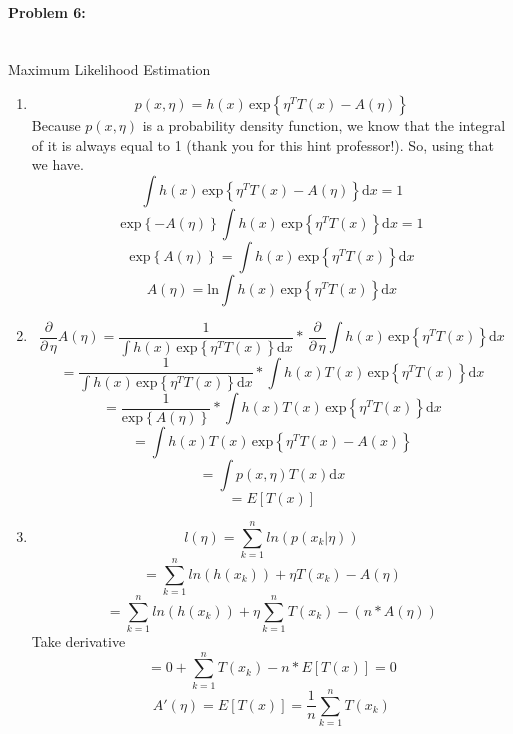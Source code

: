 \documentclass[12pt]{article}
\begin{document}
    \paragraph{Problem 6:}~\\
    Maximum Likelihood Estimation
    \begin{enumerate}
        \newcommand{\temp}{\int h(x) \, \mathrm{exp}\left\{ \eta^{T} T(x) \right\} \mathrm{d}x}
        \item
        \[ p(x, \eta) = h(x) \, \mathrm{exp}\left\{ \eta^{T} T(x) - A(\eta) \right\} \]
        Because \(p(x, \eta)\) is a probability density function, we know that the integral of it is 
        always equal to 1 (thank you for this hint professor!). So, using that we have.
        \[ \int h(x) \, \mathrm{exp}\left\{ \eta^{T} T(x) - A(\eta) \right\} \mathrm{d}x = 1 \]
        \[ \mathrm{exp}\left\{ - A(\eta)  \right\} \int h(x) \, \mathrm{exp}\left\{ \eta^{T} T(x) \right\} \mathrm{d}x = 1 \]
        \[ \mathrm{exp}\left\{ A(\eta)  \right\} = \int h(x) \, \mathrm{exp}\left\{ \eta^{T} T(x) \right\} \mathrm{d}x \]
        \[ A(\eta) = \mathrm{ln} \int h(x) \, \mathrm{exp}\left\{ \eta^{T} T(x) \right\} \mathrm{d}x \]
        \item
        \[ \frac{\partial}{\partial\,\eta} A(\eta) = \frac{1}{\temp}*\,\frac{\partial}{\partial\,\eta} \temp \]
        \[ = \frac{1}{\temp} * \int h(x) T(x) \, \mathrm{exp}\left\{ \eta^{T} T(x) \right\} \mathrm{d}x \]
        \[ = \frac{1}{\mathrm{exp} \left\{ A(\eta) \right\} } * \int h(x) T(x) \, \mathrm{exp}\left\{ \eta^{T} T(x) \right\} \mathrm{d}x \]
        \[ = \int h(x) T(x) \, \mathrm{exp}\left\{ \eta^{T} T(x) - A(x) \right\} \]
        \[ = \int p(x, \eta) T(x) \mathrm{d}x \]
        \[ = E[T(x)] \]
        \item
        \[ l(\eta) = \sum_{k=1}^{n} ln(p(x_k | \eta)) \]
        \[ = \sum_{k=1}^{n} ln(h(x_k)) + \eta T(x_k) - A(\eta) \]
        \[ = \sum_{k=1}^{n} ln(h(x_k)) + \eta \sum_{k=1}^{n} T(x_k) - (n * A(\eta)) \]
        Take derivative
        \[ = 0 + \sum_{k=1}^{n}T(x_k) - n * E[T(x)] = 0\]
        \[ A'(\eta) = E[T(x)] = \frac{1}{n}\sum_{k=1}^{n}T(x_k) \]
    \end{enumerate}
\end{document}
